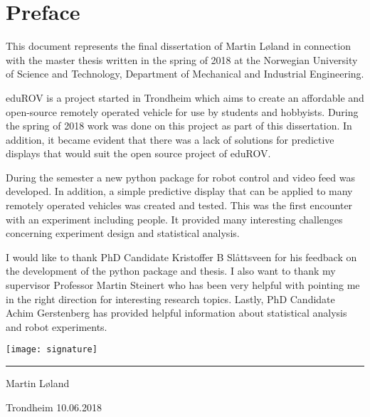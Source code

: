 \chapter*{Preface}

This document represents the final dissertation of Martin Løland in connection with the master thesis written in the spring of 2018 at the Norwegian University of Science and Technology, Department of Mechanical and Industrial Engineering.

eduROV is a project started in Trondheim which aims to create an affordable and open-source remotely operated vehicle for use by students and hobbyists. During the spring of 2018 work was done on this project as part of this dissertation. In addition, it became evident that there was a lack of solutions for predictive displays that would suit the open source project of eduROV.

During the semester a new python package for robot control and video feed was developed. In addition, a simple predictive display that can be applied to many remotely operated vehicles was created and tested. This was the first encounter with an experiment including people. It provided many interesting challenges concerning experiment design and statistical analysis.

I would like to thank PhD Candidate Kristoffer B Slåttsveen for his feedback on the development of the python package and thesis. I also want to thank my supervisor Professor Martin Steinert who has been very helpful with pointing me in the right direction for interesting research topics. Lastly, PhD Candidate Achim Gerstenberg has provided helpful information about statistical analysis and robot experiments. 

\vspace{1.5cm}
\parbox{\textwidth}{
\texttt{[image: signature]}
\vspace{-0.5cm}
\centering

\rule{6cm}{0.5pt}

Martin Løland

Trondheim 10.06.2018
}
